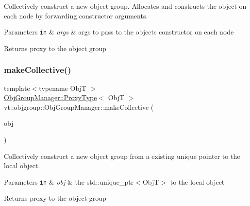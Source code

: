 Collectively construct a new object group. Allocates and constructs the object on each node by forwarding constructor arguments. 


\begin{DoxyParams}[1]{Parameters}
\mbox{\tt in}  & {\em args} & args to pass to the object\textquotesingle{}s constructor on each node\\
\hline
\end{DoxyParams}
\begin{DoxyReturn}{Returns}
proxy to the object group 
\end{DoxyReturn}
\mbox{\label{structvt_1_1objgroup_1_1_obj_group_manager_ac1c2489611d2064b89b65b90059b2c4b}} 
\subsubsection{\texorpdfstring{make\+Collective()}{makeCollective()}\hspace{0.1cm}{\footnotesize\ttfamily [2/5]}}
{\footnotesize\ttfamily template$<$typename ObjT $>$ \\
\hyperlink{structvt_1_1objgroup_1_1_obj_group_manager_aea65eef52f240a52210132eef5ce591f}{Obj\+Group\+Manager\+::\+Proxy\+Type}$<$ ObjT $>$ vt\+::objgroup\+::\+Obj\+Group\+Manager\+::make\+Collective (\begin{DoxyParamCaption}\item[{std\+::unique\+\_\+ptr$<$ ObjT $>$}]{obj }\end{DoxyParamCaption})}



Collectively construct a new object group from a existing unique pointer to the local object. 


\begin{DoxyParams}[1]{Parameters}
\mbox{\tt in}  & {\em obj} & the std\+::unique\+\_\+ptr$<$\+Obj\+T$>$ to the local object\\
\hline
\end{DoxyParams}
\begin{DoxyReturn}{Returns}
proxy to the object group 
\end{DoxyReturn}
\mbox{\label{structvt_1_1objgroup_1_1_obj_group_manager_a34d75d825c84636cd9c13f6185243414}} 
